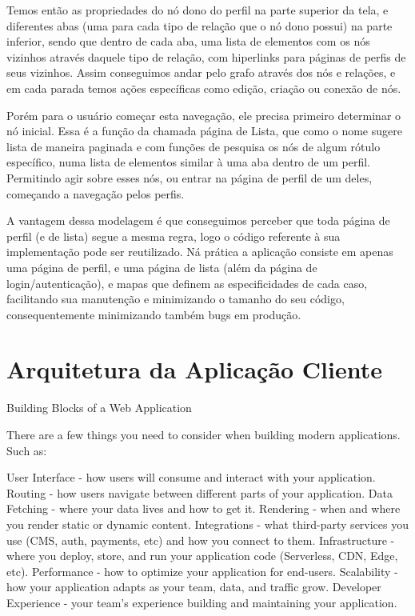 Temos então as propriedades do nó dono do perfil na parte superior da tela, e diferentes abas (uma para cada tipo de relação que o nó dono possui) na parte inferior, sendo que dentro de cada aba, uma lista de elementos com os nós vizinhos através daquele tipo de relação, com hiperlinks para páginas de perfis de seus vizinhos. Assim conseguimos andar pelo grafo através dos nós e relações, e em cada parada temos ações específicas como edição, criação ou conexão de nós.

Porém para o usuário começar esta navegação, ele precisa primeiro determinar o nó inicial. Essa é a função da chamada página de Lista, que como o nome sugere lista de maneira paginada e com funções de pesquisa os nós de algum rótulo específico, numa lista de elementos similar à uma aba dentro de um perfil. Permitindo agir sobre esses nós, ou entrar na página de perfil de um deles, começando a navegação pelos perfis.

A vantagem dessa modelagem é que conseguimos perceber que toda página de perfil (e de lista) segue a mesma regra, logo o código referente à sua implementação pode ser reutilizado. Ná prática a aplicação consiste em apenas uma página de perfil, e uma página de lista (além da página de login/autenticação), e mapas que definem as especificidades de cada caso, facilitando sua manutenção e minimizando o tamanho do seu código, consequentemente minimizando também bugs em produção.

\section{Arquitetura da Aplicação Cliente}
Building Blocks of a Web Application

There are a few things you need to consider when building modern applications. Such as:

    User Interface - how users will consume and interact with your application.
    Routing - how users navigate between different parts of your application.
    Data Fetching - where your data lives and how to get it.
    Rendering - when and where you render static or dynamic content.
    Integrations - what third-party services you use (CMS, auth, payments, etc) and how you connect to them.
    Infrastructure - where you deploy, store, and run your application code (Serverless, CDN, Edge, etc).
    Performance - how to optimize your application for end-users.
    Scalability - how your application adapts as your team, data, and traffic grow.
    Developer Experience - your team’s experience building and maintaining your application.
